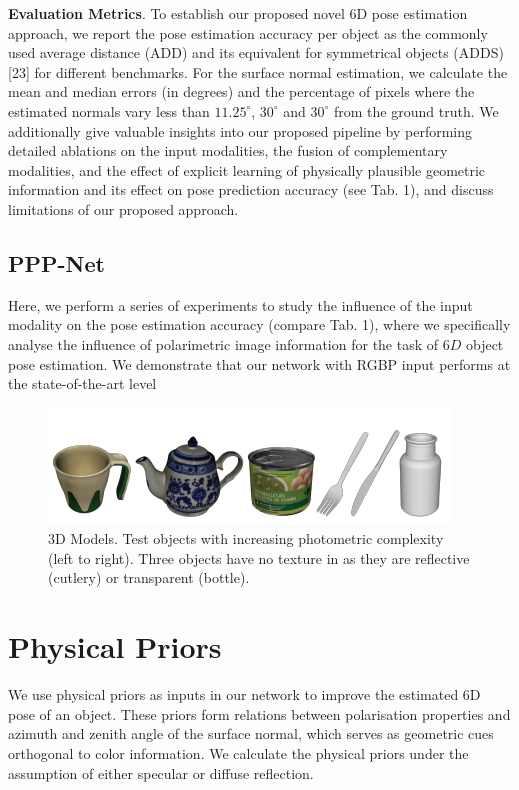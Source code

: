 \documentclass[10pt,twocolumn,letterpaper]{article}
\begin{document}
\textbf{Evaluation Metrics}. To establish our proposed novel 6D pose estimation approach, we report the pose estimation accuracy per object as the commonly used average distance (ADD) and its equivalent for symmetrical objects (ADDS) [23] for different benchmarks. For the surface normal estimation, we calculate the mean and median errors (in degrees) and the percentage of pixels where the estimated normals vary less than $11.25^\circ$, $30^\circ$ and $30^\circ$ from the ground truth. We additionally give valuable insights into our proposed pipeline by performing detailed ablations on the input modalities, the fusion of complementary modalities, and the
effect of explicit learning of physically plausible geometric
information and its effect on pose prediction accuracy (see Tab. 1), and discuss limitations of our proposed approach.
\subsection{PPP-Net}
Here, we perform a series of experiments to study the influence of the input modality on the pose estimation accuracy (compare Tab. 1), where we specifically analyse the influence of polarimetric image information for the task of $6D$ object pose estimation. We demonstrate that our network with RGBP input performs at the state-of-the-art level
\begin{figure}[H]
    \centering
    \includegraphics{image/Capture d'Ã©cran_20230110_145736.png}
    \caption{3D Models. Test objects with increasing photometric complexity (left to right). Three objects have no texture in as they are reflective (cutlery) or transparent (bottle).}
    \label{fig:my_label}
\end{figure}
\renewcommand{\thesection}{\Alph{section}}
\section{ Physical Priors}
We use physical priors as inputs in our network to improve the estimated 6D pose of an object. These priors form relations between polarisation properties and azimuth and zenith angle of the surface normal, which serves as geometric cues orthogonal to color information. We calculate the physical priors under the assumption of either specular or diffuse reflection.
\end{document}

